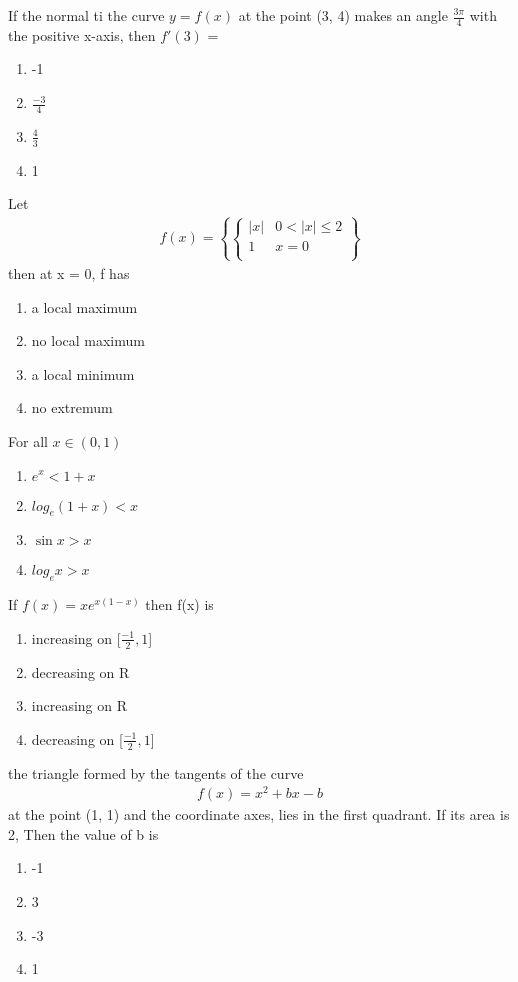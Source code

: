 \item If the normal ti the curve $y = f(x)$ at the point (3, 4) makes an angle $\frac{3\pi}{4}$ with the positive 
x-axis, then $f'(3)$ =
\begin{enumerate}
\item -1
\item $\frac{-3}{4}$
\item $\frac{4}{3}$
\item 1
\end{enumerate}

\item Let
\begin{align*} 
f(x) =
\left\lbrace\begin{cases} 
      |x|  &  0 < |x| \leq 2 \\
      1  & x = 0  \\
\end{cases}\right\rbrace 
\end{align*}
then at x = 0, f has
\begin{enumerate}
\item a local maximum
\item no local maximum
\item a local minimum
\item no extremum
\end{enumerate}

\item For all $x \in (0, 1)$
\begin{enumerate}
\item $e^x < 1 + x$
\item $log_e(1 + x) < x$
\item $\sin x > x$
\item $log_ex > x$
\end{enumerate}

\item If $f(x) = xe^{x(1 - x)}$ then f(x) is
\begin{enumerate}
\item increasing on [$\frac{-1}{2}, 1$]
\item decreasing on R
\item increasing on R
\item decreasing on [$\frac{-1}{2}, 1$]
\end{enumerate}

\item the triangle formed by the tangents of the curve 
\begin{align*} 
f(x) = x^2 + bx - b
\end{align*}
at the point (1, 1) and the coordinate axes, lies in the first quadrant. If its area is 2, Then the value of b is
\begin{enumerate}
\item -1
\item 3
\item -3
\item 1
\end{enumerate}

